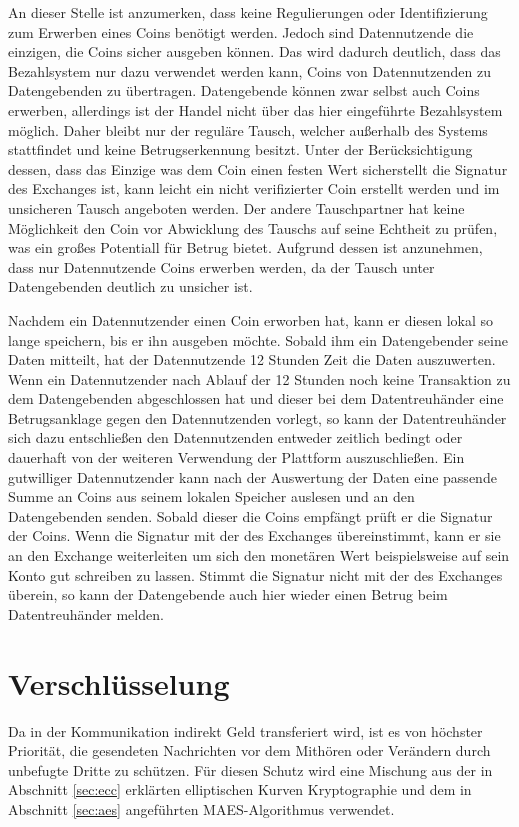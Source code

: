 \documentclass[
	fontsize=12pt,
	headings=small,
	parskip=half,           %
	bibliography=totoc,
	numbers=noenddot,       %
	open=any,               %
]{scrreprt}
\begin{document}
An dieser Stelle ist anzumerken, dass keine Regulierungen oder Identifizierung zum Erwerben eines Coins benötigt werden. Jedoch sind Datennutzende die einzigen, die Coins sicher ausgeben können. Das wird dadurch deutlich, dass das Bezahlsystem nur dazu verwendet werden kann, Coins von Datennutzenden zu Datengebenden zu übertragen. Datengebende können zwar selbst auch Coins erwerben, allerdings ist der Handel nicht über das hier eingeführte Bezahlsystem möglich. Daher bleibt nur der reguläre Tausch, welcher außerhalb des Systems stattfindet und keine Betrugserkennung besitzt. Unter der Berücksichtigung dessen, dass das Einzige was dem Coin einen festen Wert sicherstellt die Signatur des Exchanges ist, kann leicht ein nicht verifizierter Coin erstellt werden und im unsicheren Tausch angeboten werden. Der andere Tauschpartner hat keine Möglichkeit den Coin vor Abwicklung des Tauschs auf seine Echtheit zu prüfen, was ein großes Potentiall für Betrug bietet. Aufgrund dessen ist anzunehmen, dass nur Datennutzende Coins erwerben werden, da der Tausch unter Datengebenden deutlich zu unsicher ist.

Nachdem ein Datennutzender einen Coin erworben hat, kann er diesen lokal so lange speichern, bis er ihn ausgeben möchte. Sobald ihm ein Datengebender seine Daten mitteilt, hat der Datennutzende 12 Stunden Zeit die Daten auszuwerten. Wenn ein Datennutzender nach Ablauf der 12 Stunden noch keine Transaktion zu dem Datengebenden abgeschlossen hat und dieser bei dem Datentreuhänder eine Betrugsanklage gegen den Datennutzenden vorlegt, so kann der Datentreuhänder sich dazu entschließen den Datennutzenden entweder zeitlich bedingt oder dauerhaft von der weiteren Verwendung der Plattform auszuschließen. Ein gutwilliger Datennutzender kann nach der Auswertung der Daten eine passende Summe an Coins aus seinem lokalen Speicher auslesen und an den Datengebenden senden. Sobald dieser die Coins empfängt prüft er die Signatur der Coins. Wenn die Signatur mit der des Exchanges übereinstimmt, kann er sie an den Exchange weiterleiten um sich den monetären Wert beispielsweise auf sein Konto gut schreiben zu lassen. Stimmt die Signatur nicht mit der des Exchanges überein, so kann der Datengebende auch hier wieder einen Betrug beim Datentreuhänder melden.

\section{Verschlüsselung}
Da in der Kommunikation indirekt Geld transferiert wird, ist es von höchster Priorität, die gesendeten Nachrichten vor dem Mithören oder Verändern durch unbefugte Dritte zu schützen. Für diesen Schutz wird eine Mischung aus der in Abschnitt \ref{sec:ecc} erklärten elliptischen Kurven Kryptographie und dem in Abschnitt \ref{sec:aes} angeführten MAES-Algorithmus verwendet. 
\end{document}

